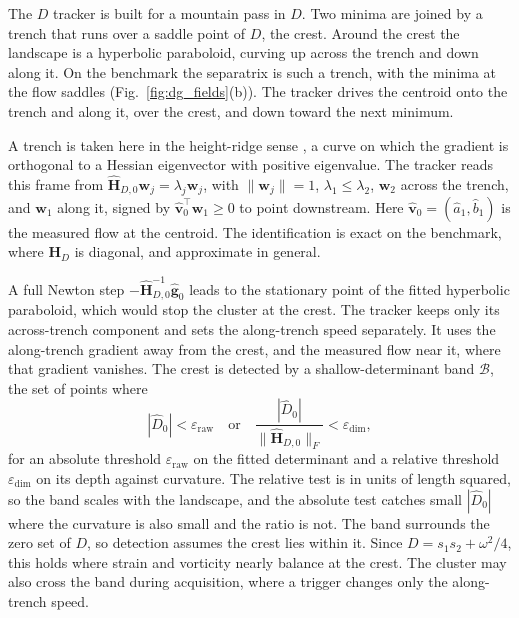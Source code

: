 \documentclass[lettersize,journal]{IEEEtran}
\begin{document}
The $D$ tracker is built for a mountain pass in $D$. Two minima are
joined by a trench that runs over a saddle point of $D$, the crest.
Around the crest the landscape is a hyperbolic paraboloid, curving up
across the trench and down along it. On the benchmark the separatrix is
such a trench, with the minima at the flow saddles
(Fig.~\ref{fig:dg_fields}(b)). The tracker drives the centroid onto the
trench and along it, over the crest, and down toward the next minimum.

A trench is taken here in the height-ridge sense \cite{33}, a curve on
which the gradient is orthogonal to a Hessian eigenvector with positive
eigenvalue. The tracker reads this frame from
$\hat{\mathbf{H}}_{D,0}\mathbf{w}_j = \lambda_j \mathbf{w}_j$, with
$\|\mathbf{w}_j\| = 1$, $\lambda_1 \leq \lambda_2$, $\mathbf{w}_2$ across
the trench, and $\mathbf{w}_1$ along it, signed by
$\hat{\mathbf{v}}_0^\top \mathbf{w}_1 \geq 0$ to point downstream. Here
$\hat{\mathbf{v}}_0 = (\hat{a}_1, \hat{b}_1)$ is the measured flow at the centroid. The
identification is exact on the benchmark, where $\mathbf{H}_D$ is
diagonal, and approximate in general.

A full Newton step $-\hat{\mathbf{H}}_{D,0}^{-1}\hat{\mathbf{g}}_0$ leads
to the stationary point of the fitted hyperbolic paraboloid, which would
stop the cluster at the crest. The tracker keeps only its across-trench
component and sets the along-trench speed separately. It uses the
along-trench gradient away from the crest, and the measured flow near
it, where that gradient vanishes. The crest is detected by a
shallow-determinant band $\mathcal{B}$, the set of points where
\begin{equation}
    |\hat{D}_0| < \varepsilon_{\mathrm{raw}}
    \quad\text{or}\quad
    \frac{|\hat{D}_0|}{\|\hat{\mathbf{H}}_{D,0}\|_F}
        < \varepsilon_{\dim},
    \label{eq:band}
\end{equation}
for an absolute threshold $\varepsilon_{\mathrm{raw}}$ on the fitted
determinant and a relative threshold $\varepsilon_{\dim}$ on its depth
against curvature. The relative
test is in units of length squared, so the band scales with the
landscape, and the absolute test catches small $|\hat{D}_0|$ where the
curvature is also small and the ratio is not. The band surrounds the
zero set of $D$, so detection assumes the crest lies within it. Since
$D = s_1 s_2 + \omega^2/4$, this holds where strain and vorticity nearly
balance at the crest. The cluster may also cross the band
during acquisition, where a trigger changes only the along-trench
speed.
\end{document}
